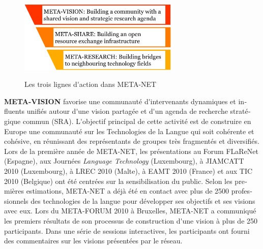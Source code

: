 \documentclass[]{../metanetpaper}
\begin{document}
\begin{french}
\begin{multicols}{2}
\begin{figure}[!ht]
\begin{center}
  \includegraphics[width=3.0in]{../_media/french/meta_3lines}\\
  \caption{Les trois lignes d{\mbox '}action dans META-NET}
  \label{fig:metanetactionlines}
\end{center}
\end{figure}

\textbf{META-VISION} favorise une communauté d{\mbox '}intervenants dynamiques et influents unifiés autour d{\mbox '}une vision partagée et d{\mbox '}un agenda de recherche stratégique commun (SRA). L{\mbox '}objectif principal de cette activité est de construire en Europe une communauté sur les Technologies de la Langue qui soit cohérente et cohésive, en réunissant des représentants de groupes très fragmentés et diversifiés. Lors de la première année de META-NET, les présentations au Forum FLaReNet (Espagne), aux Journées {\it Language Technology} (Luxembourg), à JIAMCATT 2010 (Luxembourg), à LREC 2010 (Malte), à EAMT 2010 (France) et aux TIC 2010 (Belgique) ont été centrées sur la sensibilisation du public. Selon les premières estimations, META-NET a déjà été en contact avec plus de 2500 professionnels des technologies de la langue pour développer ses objectifs et ses visions avec eux. Lors du META-FORUM 2010 à Bruxelles, META-NET a communiqué les premiers résultats de son processus de construction d{\mbox '}une vision à plus de 250 participants. Dans une série de sessions interactives, les participants ont fourni des commentaires sur les visions présentées par le réseau.


\end{multicols}
\end{french}
\end{document}
